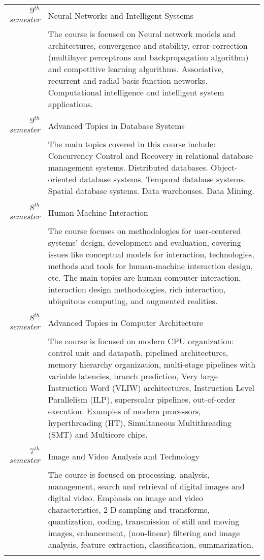 \documentclass[a4paper,10pt]{article}
\begin{document}
\begin{longtable}[l]{r|p{15cm}}
\textit{$9^{th}$ semester} & \large{Neural Networks and Intelligent Systems}\\
& The course is focused on Neural network models and architectures, convergence and stability, error-correction (multilayer perceptrons and backpropagation algorithm) and competitive learning algorithms. Associative, recurrent and radial basis function networks. Computational intelligence and intelligent system applications.\\\multicolumn{2}{c}{}\\
\textit{$9^{th}$ semester} & \large{Advanced Topics in Database Systems}
\\& The main topics covered in this course include: Concurrency Control and Recovery in relational database management systems. Distributed databases. Object-oriented database systems. Temporal database systems. Spatial database systems. Data warehouses. Data Mining.\\\multicolumn{2}{c}{}\\
\textit{$8^{th}$ semester} & \large{Human-Machine Interaction}
\\& The course focuses on methodologies for user-centered systems' design, development and evaluation, covering issues like conceptual models for interaction, technologies, methods and tools for human-machine interaction design, etc. The main topics are human-computer interaction, interaction design methodologies, rich interaction, ubiquitous computing, and augmented realities.\\\multicolumn{2}{c}{}\\
\textit{$8^{th}$ semester} & \large{Advanced Topics in Computer Architecture}
\\& The course is focused on modern CPU organization: control unit and datapath, pipelined architectures, memory hierarchy organization, multi-stage pipelines with variable latencies, branch prediction, Very large Instruction Word (VLIW) architectures, Instruction Level Parallelism (ILP), superscalar pipelines, out-of-order execution. Examples of modern processors, hyperthreading (HT), Simultaneous Multithreading (SMT) and Multicore chips.\\\multicolumn{2}{c}{}\\
\textit{$7^{th}$ semester} & \large{Image and Video Analysis and Technology}
\\& The course is focused on processing, analysis, management, search and retrieval of digital images and digital video. Emphasis on image and video characteristics, 2-D sampling and transforms, quantization, coding, transmission of still and moving images, enhancement, (non-linear) filtering and image analysis, feature extraction, classification, summarization.\\\multicolumn{2}{c}{}\\
\end{longtable}
\end{document}
